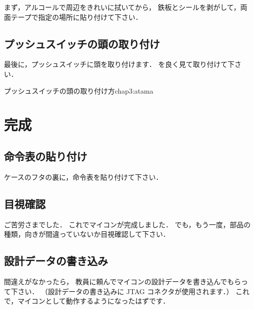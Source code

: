 まず，アルコールで周辺をきれいに拭いてから，
鉄板とシールを剥がして，両面テープで指定の場所に貼り付けて下さい．


\subsection{プッシュスイッチの頭の取り付け}
最後に，プッシュスイッチに頭を取り付けます．
を良く見て取り付けて下さい．

{プッシュスイッチの頭の取り付け方}{chap3:atama}

\section{完成}

\subsection{命令表の貼り付け}
ケースのフタの裏に，命令表を貼り付けて下さい．

\subsection{目視確認}
ご苦労さまでした．
これでマイコンが完成しました．
でも，もう一度，部品の種類，向きが間違っていないか目視確認して下さい．


\subsection{設計データの書き込み}
間違えがなかったら，
教員に頼んでマイコンの設計データを書き込んでもらって下さい．
（設計データの書き込みに JTAG コネクタが使用されます．）
これで，マイコンとして動作するようになったはずです．

